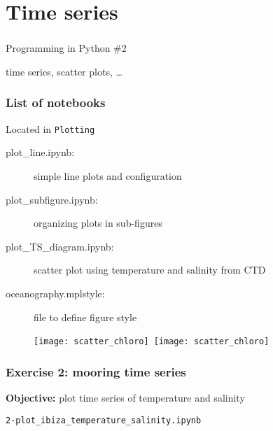 \section{Time series}

{
\begin{frame}
\frametitle{}
{\fontsize{40}{50}\selectfont Programming in Python \#2} 

{\huge time series, scatter plots, \ldots} 

\end{frame}
}


\begin{frame}[c, fragile]
\frametitle{List of notebooks}

Located in \verb|Plotting|
{
\scriptsize
\begin{description}
\item[plot\_line.ipynb:] simple line plots and configuration
\item[plot\_subfigure.ipynb:] organizing plots in sub-figures
\item[plot\_TS\_diagram.ipynb:] scatter plot using temperature and salinity from CTD
\item[]
\item[oceanography.mplstyle:] file to define figure style  

\end{description}
}

\begin{figure}
\texttt{[image: scatter\_chloro]}~\texttt{[image: scatter\_chloro]}
\end{figure}

\end{frame}

\begin{frame}[c, fragile]
\frametitle{Exercise 2: mooring time series}

\textbf{Objective:} plot time series of temperature and salinity

\vspace{1cm}

\exercise \verb|2-plot_ibiza_temperature_salinity.ipynb|

\end{frame}